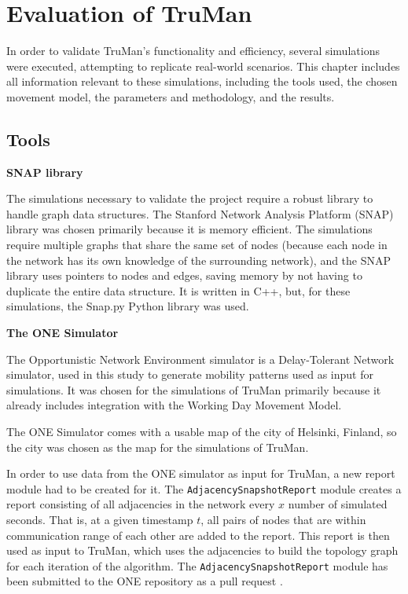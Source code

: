 \chapter{Evaluation of TruMan}
\label{chap:simulations}

In order to validate TruMan's functionality and efficiency, several simulations were executed, attempting to replicate real-world scenarios.
This chapter includes all information relevant to these simulations, including the tools used, the chosen movement model, the parameters and methodology, and the results.

\section{Tools}
\label{section:tools}

\textbf{SNAP library}

The simulations necessary to validate the project require a robust library to handle graph data structures.
The Stanford Network Analysis Platform (SNAP) library \citep{snap} was chosen primarily because it is memory efficient.
The simulations require multiple graphs that share the same set of nodes (because each node in the network has its own knowledge of the surrounding network), and the SNAP library uses pointers to nodes and edges, saving memory by not having to duplicate the entire data structure.
It is written in C++, but, for these simulations, the Snap.py Python library was used.

\vspace{5mm}
\textbf{The ONE Simulator}

The Opportunistic Network Environment simulator \citep{keranen2009one} \citep{onerepo} is a Delay-Tolerant Network simulator, used in this study to generate mobility patterns used as input for simulations.
It was chosen for the simulations of TruMan primarily because it already includes integration with the Working Day Movement Model.

The ONE Simulator comes with a usable map of the city of Helsinki, Finland, so the city was chosen as the map for the simulations of TruMan.

In order to use data from the ONE simulator as input for TruMan, a new report module had to be created for it.
The \texttt{AdjacencySnapshotReport} module creates a report consisting of all adjacencies in the network every $x$ number of simulated seconds.
That is, at a given timestamp $t$, all pairs of nodes that are within communication range of each other are added to the report.
This report is then used as input to TruMan, which uses the adjacencies to build the topology graph for each iteration of the algorithm.
The \texttt{AdjacencySnapshotReport} module has been submitted to the ONE repository as a pull request \citep{adjacencypull}.

